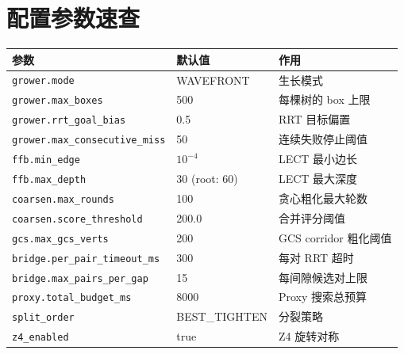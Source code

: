 \documentclass[11pt,a4paper]{article}
\begin{document}
\section{配置参数速查}
\label{app:config}

\begin{table}[ht]
\centering
\small
\begin{tabularx}{\textwidth}{@{}llX@{}}
\toprule
\textbf{参数} & \textbf{默认值} & \textbf{作用} \\
\midrule
\texttt{grower.mode} & WAVEFRONT & 生长模式 \\
\texttt{grower.max\_boxes} & 500 & 每棵树的 box 上限 \\
\texttt{grower.rrt\_goal\_bias} & 0.5 & RRT 目标偏置 \\
\texttt{grower.max\_consecutive\_miss} & 50 & 连续失败停止阈值 \\
\texttt{ffb.min\_edge} & $10^{-4}$ & LECT 最小边长 \\
\texttt{ffb.max\_depth} & 30 (root: 60) & LECT 最大深度 \\
\texttt{coarsen.max\_rounds} & 100 & 贪心粗化最大轮数 \\
\texttt{coarsen.score\_threshold} & 200.0 & 合并评分阈值 \\
\texttt{gcs.max\_gcs\_verts} & 200 & GCS corridor 粗化阈值 \\
\texttt{bridge.per\_pair\_timeout\_ms} & 300 & 每对 RRT 超时 \\
\texttt{bridge.max\_pairs\_per\_gap} & 15 & 每间隙候选对上限 \\
\texttt{proxy.total\_budget\_ms} & 8000 & Proxy 搜索总预算 \\
\texttt{split\_order} & BEST\_TIGHTEN & 分裂策略 \\
\texttt{z4\_enabled} & true & Z4 旋转对称 \\
\bottomrule
\end{tabularx}
\end{table}
\end{document}

